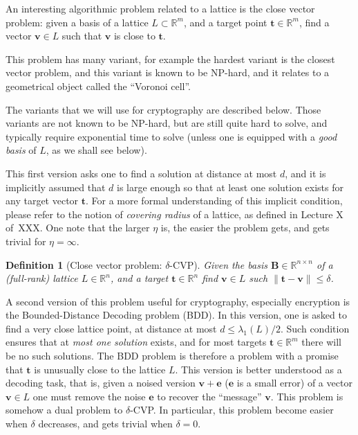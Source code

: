 \documentclass[12pt]{article}
\renewcommand{\vec}{\mathbf}
\newcommand{\R}{\mathbb R}
\newtheorem{definition}{Definition}{\bfseries}{\upshape}
\begin{document}
An interesting algorithmic problem related to a lattice is the close vector problem: given a basis of a lattice $L \subset \R^m$, and a target point $\vec t \in \R^m$, find a vector $\vec v \in L$ such that $\vec v$ is close to $\vec t$.

This problem has many variant, for example the hardest variant is the closest vector problem, and this variant is known to be NP-hard, and it relates to a geometrical object called the ``Voronoi cell''. 

The variants that we will use for cryptography are described below. Those variants are not known to be NP-hard, but are still quite hard to solve, and typically require exponential time to solve (unless one is equipped with a {\em good basis} of $L$, as we shall see below).

This first version asks one to find a solution at distance at most $d$, and it is implicitly assumed that $d$ is large enough so that at least one solution exists for any target vector $\vec t$. For a more formal understanding of this implicit condition, please refer to the notion of {\em covering radius} of a lattice, as defined in Lecture X of~XXX. One note that the larger $\eta$ is, the easier the problem gets, and gets trivial for $\eta = \infty$.

\begin{definition}[Close vector problem: $\delta$-CVP]
  Given the basis $\vec B \in \R^{n \times n}$ of a (full-rank) lattice $L \in \R^n$, and a target $\vec t \in \R^n$ find $\vec v \in L$ such $\|\vec t - \vec v\| \leq \delta$.
\end{definition}



A second version of this problem useful for cryptography, especially encryption is the Bounded-Distance Decoding problem (BDD). In this version, one is asked to find a very close lattice point, at distance at most $d \leq \lambda_1(L)/2$. Such condition ensures that at {\em most one solution} exists, and for most targets $\vec t \in \R^m$ there will be no such solutions. The BDD problem is therefore a problem with a promise that $\vec t$ is unusually close to the lattice $L$. This version is better understood as a decoding task, that is, given a noised version $\vec v + \vec e$ ($\vec e$ is a small error) of a vector $\vec v \in L$ one must remove the noise $\vec e$ to recover the ``message'' $\vec v$. This problem is somehow a dual problem to $\delta$-CVP. In particular, this problem become easier when $\delta$ decreases, and gets trivial when $\delta = 0$. 
\end{document}
